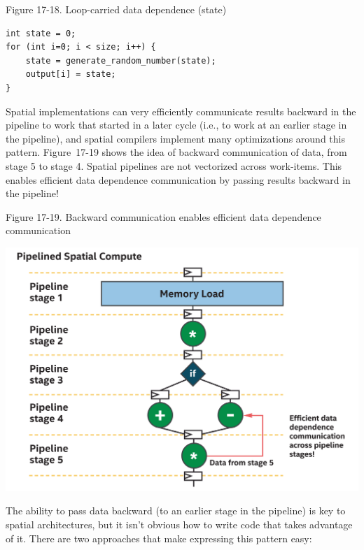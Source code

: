 \hspace*{\fill} \par %
Figure 17-18. Loop-carried data dependence (state)
\begin{lstlisting}[caption={}]
int state = 0;
for (int i=0; i < size; i++) {
	state = generate_random_number(state);
	output[i] = state;
}
\end{lstlisting}

Spatial implementations can very efficiently communicate results backward in the pipeline to work that started in a later cycle (i.e., to work at an earlier stage in the pipeline), and spatial compilers implement many optimizations around this pattern. Figure 17-19 shows the idea of backward communication of data, from stage 5 to stage 4. Spatial pipelines are not vectorized across work-items. This enables efficient data dependence communication by passing results backward in the pipeline!\par

\hspace*{\fill} \par %
Figure 17-19. Backward communication enables efficient data dependence communication
\begin{center}
	\includegraphics[width=1.0\textwidth]{content/chapter-17/images/16}
\end{center}

The ability to pass data backward (to an earlier stage in the pipeline) is key to spatial architectures, but it isn’t obvious how to write code that takes advantage of it. There are two approaches that make expressing this pattern easy:\par

